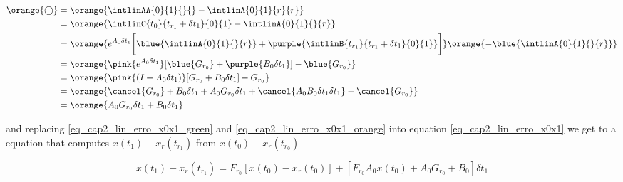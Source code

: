 \begin{align}
  \orange{\bigcirc} 	&= \orange{ \intlinAA{0}{1}{}{} - \intlinA{0}{1}{r}{r} } \nonumber \\ 
				   	&= \orange{ \intlinC{t_0}{t_{r_1}+\delta t_1}{0}{1} - \intlinA{0}{1}{}{r} } \nonumber \\
				   	&= \orange{ e^{A_0 \delta t_1} \bigg[ \blue{\intlinA{0}{1}{}{r}} + \purple{\intlinB{t_{r_1}}{t_{r_1} + \delta t_1}{0}{1}} \bigg] }
				   	   \orange{ -\blue{\intlinA{0}{1}{}{r}} } \nonumber \\
				   	&= \orange{ \pink{e^{A_0 \delta t_1}} [ \blue{G_{r_0}} + \purple{B_0 \delta t_1} ] - \blue{G_{r_0}} } \nonumber \\
				   	&= \orange{ \pink{(I + A_0 \delta t_1)}[ G_{r_0} + B_0 \delta t_1 ] - G_{r_0} } \nonumber \\
				   	&= \orange{ \cancel{G_{r_0}} + B_0 \delta t_1 + A_0 G_{r_0} \delta t_1 + \cancel{A_0 B_0 \delta t_1 \delta t_1} - \cancel{G_{r_0}} } \nonumber \\
					\label{eq_cap2_lin_erro_x0x1_orange}
				   	&= \orange{ A_0 G_{r_0} \delta t_1 + B_0 \delta t_1 }
\end{align}

and replacing \eqref{eq_cap2_lin_erro_x0x1_green} and \eqref{eq_cap2_lin_erro_x0x1_orange} into equation \eqref{eq_cap2_lin_erro_x0x1} we get to a equation that computes $x(t_1) - x_r(t_{r_1})$ from $x(t_0) - x_r(t_{r_0})$

\begin{equation}
	\label{eq_cap2_lin_erro_x0x1_resultado}
	x(t_1) - x_r(t_{r_1}) = F_{r_0} [ x(t_0) - x_r(t_0) ] + [ F_{r_0} A_0 x(t_0) + A_0 G_{r_0} + B_0 ] \delta t_1
\end{equation}